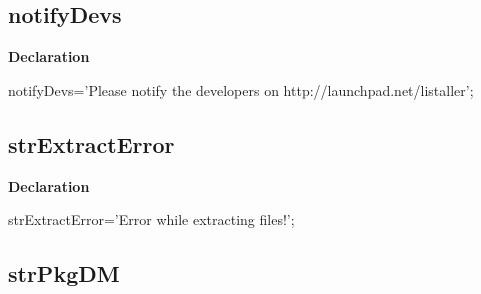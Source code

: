\documentclass{report}
\newif\ifpdf
\begin{document}
\subsection*{notifyDevs}
\fi
\label{trstrings-notifyDevs}
\begin{list}{}{
\setlength{\itemindent}{0cm}
\setlength{\listparindent}{0cm}
\setlength{\leftmargin}{\evensidemargin}
\addtolength{\leftmargin}{\tmplength}
\settowidth{\labelsep}{X}
\addtolength{\leftmargin}{\labelsep}
\setlength{\labelwidth}{\tmplength}
}
\item[\textbf{Declaration}\hfill]
\ifpdf
\begin{flushleft}
\fi
\begin{ttfamily}
notifyDevs='Please notify the developers on http://launchpad.net/listaller';\end{ttfamily}

\ifpdf
\end{flushleft}
\fi

\end{list}
\ifpdf
\subsection*{\large{\textbf{strExtractError}}\normalsize\hspace{1ex}\hrulefill}
\else
\subsection*{strExtractError}
\fi
\label{trstrings-strExtractError}
\begin{list}{}{
\setlength{\itemindent}{0cm}
\setlength{\listparindent}{0cm}
\setlength{\leftmargin}{\evensidemargin}
\addtolength{\leftmargin}{\tmplength}
\settowidth{\labelsep}{X}
\addtolength{\leftmargin}{\labelsep}
\setlength{\labelwidth}{\tmplength}
}
\item[\textbf{Declaration}\hfill]
\ifpdf
\begin{flushleft}
\fi
\begin{ttfamily}
strExtractError='Error while extracting files!';\end{ttfamily}

\ifpdf
\end{flushleft}
\fi

\end{list}
\ifpdf
\subsection*{\large{\textbf{strPkgDM}}\normalsize\hspace{1ex}\hrulefill}
\else
\end{document}
